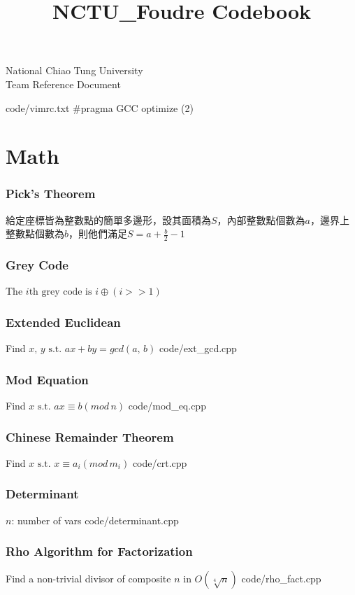 \documentclass [landscape,8pt,a4paper,twocolumn]{article}
\title {NCTU\_Foudre Codebook}
\begin{document}
\thispagestyle{fancy}
{ \Huge National Chiao Tung University \\ Team Reference Document}
\tableofcontents

\newpage
 {code/vimrc.txt}
\#pragma GCC optimize (2)

\newpage
\part{Math}

\section{Pick's Theorem}
給定座標皆為整數點的簡單多邊形，設其面積為$ S $，內部整數點個數為$ a $，邊界上整數點個數為$ b $，則他們滿足$ S=a+\frac{b}{2}-1 $

\section{Grey Code}
The $ i \text{th grey code is } i \oplus (i>>1) $

\section{Extended Euclidean}
Find $ x, \, y \text{ s.t. } ax+by=gcd(a, \, b) $
 {code/ext_gcd.cpp}

\section{Mod Equation}
Find $ x \text{ s.t. } ax \equiv b(mod \, n) $
 {code/mod_eq.cpp}

\section{Chinese Remainder Theorem}
Find $ x \text{ s.t. } x \equiv a_i(mod \, m_i) $
 {code/crt.cpp}

\section{Determinant}
$ n $: number of vars
 {code/determinant.cpp}

\section{Rho Algorithm for Factorization}
Find a non-trivial divisor of composite $ n $ in $ O(\sqrt[4]{n}) $
 {code/rho_fact.cpp}
\end{document}
